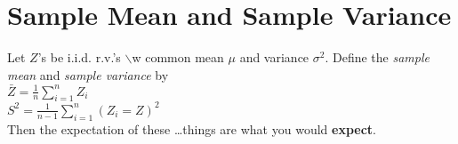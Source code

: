 \section{Sample Mean and Sample Variance}
Let \(Z\)'s be i.i.d. r.v.'s \(\backslash\)w common mean \(\mu\) and variance
\(\sigma^2\). Define the \emph{sample mean} and \emph{sample variance} by\\
\(\bar{Z} = \frac{1}{n} \sum_{i=1}^n Z_i\)\\
\(S^2 = \frac{1}{n-1} \sum_{i=1}^n (Z_i = Z)^2\)\\
Then the expectation of these \dots things are what you would \textbf{expect}.
